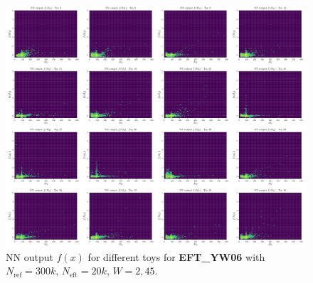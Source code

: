 \begin{figure}[H]
	\centering
	\includegraphics[width=1.0\textwidth]{Python/RESULTS/INV_MASS/f_plot_Zeft.pdf}
	\caption{NN output $f(x)$ for different toys for \textbf{EFT\_YW06} with $N_\mathrm{ref}=300\si{k}$, $N_\mathrm{eft}=20\si{k}$, $W=2,45$.}
	\label{fig:F_PLOT_Z_EFT}
\end{figure}




